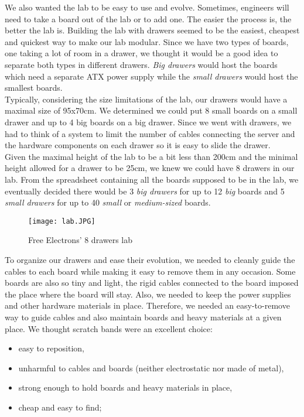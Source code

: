 We also wanted the lab to be easy to use and evolve. Sometimes, engineers will need to take a board out of the lab or to add one. The easier the process is, the better the lab is. Building the lab with drawers seemed to be the easiest, cheapest and quickest way to make our lab modular. Since we have two types of boards, one taking a lot of room in a drawer, we thought it would be a good idea to separate both types in different drawers. \textit{Big drawers} would host the boards which need a separate ATX power supply while the \textit{small drawers} would host the smallest boards.\\
Typically, considering the size limitations of the lab, our drawers would have a maximal size of 95x70cm. We determined we could put 8 small boards on a small drawer and up to 4 big boards on a big drawer. Since we went with drawers, we had to think of a system to limit the number of cables connecting the server and the hardware components on each drawer so it is easy to slide the drawer.\\
Given the maximal height of the lab to be a bit less than 200cm and the minimal height allowed for a drawer to be 25cm, we knew we could have 8 drawers in our lab. From the spreadsheet containing all the boards supposed to be in the lab, we eventually decided there would be 3 \textit{big drawers} for up to 12 \textit{big} boards and 5 \textit{small drawers} for up to 40 \textit{small} or \textit{medium-sized} boards.

\begin{figure}
  \centering
  \texttt{[image: lab.JPG]}
  \caption{Free Electrons' 8 drawers lab}
\end{figure}

To organize our drawers and ease their evolution, we needed to cleanly guide the cables to each board while making it easy to remove them in any occasion. Some boards are also so tiny and light, the rigid cables connected to the board imposed the place where the board will stay. Also, we needed to keep the power supplies and other hardware materials in place. Therefore, we needed an easy-to-remove way to guide cables and also maintain boards and heavy materials at a given place. We thought scratch bands were an excellent choice:

\begin{itemize}
  \item easy to reposition,
  \item unharmful to cables and boards (neither electrostatic nor made of metal),
  \item strong enough to hold boards and heavy materials in place,
  \item cheap and easy to find;
\end{itemize}

